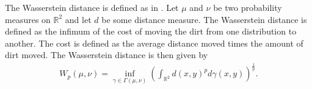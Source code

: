 




The Wasserstein distance is defined as in . Let $\mu$ and $\nu$ be two probability measures on $\mathbb{R}^2$ and let $d$ be some distance measure. The Wasserstein distance is defined as the infimum of the cost of moving the dirt from one distribution to another. The cost is defined as the average distance moved times the amount of dirt moved. The Wasserstein distance is then given by
\begin{align*}
    W_p(\mu,\nu) = \inf_{\gamma \in \Gamma(\mu,\nu)} \left( \int_{\mathbb{R}^2} d(x,y)^p d\gamma(x,y) \right)^{\frac{1}{p}}.
\end{align*}


